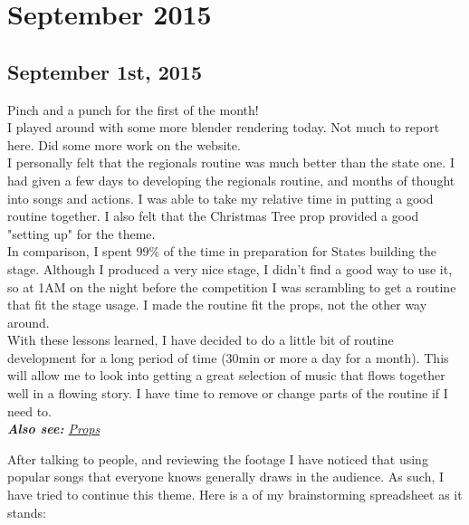 \chapter{September 2015}
        \section{September 1st, 2015}
    		Pinch and a punch for the first of the month!\\
    		
    		I played around with some more blender rendering today. Not much to report here. Did some more work on the website.\\
    		
    		I personally felt that the regionals routine was much better than the state one. I had given a few days to developing the regionals routine, and months of thought into songs and actions. I was able to take my relative time in putting a good routine together. I also felt that the Christmas Tree prop provided a good "setting up" for the theme.\\
    		
    		In comparison, I spent 99\% of the time in preparation for States building the stage. Although I produced a very nice stage, I didn't find a good way to use it, so at 1AM on the night before the competition I was scrambling to get a routine that fit the stage usage. I made the routine fit the props, not the other way around.\\
    		
    		With these lessons learned, I have decided to do a little bit of routine development for a long period of time (30min or more a day for a month). This will allow me to look into getting a great selection of music that flows together well in a flowing story. I have time to remove or change parts of the routine if I need to.\\
            
            \textit{\textbf{Also see: }\hyperref[Props]{Props}}
    		
    		After talking to people, and reviewing the footage I have noticed that using popular songs that everyone knows generally draws in the audience. As such, I have tried to continue this theme. Here is a  of my brainstorming spreadsheet as it stands:\\
    		
